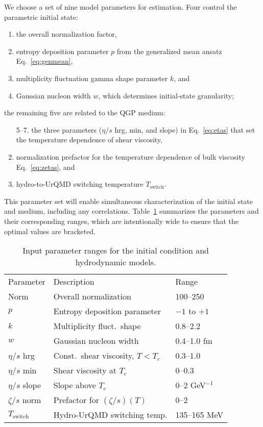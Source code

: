\documentclass[aps,prc,reprint,amsmath,nofootinbib,superscriptaddress]{revtex4-1}
\newcommand{\paddedhline}{\noalign{\smallskip}\hline\noalign{\smallskip}}
\begin{document}
We choose a set of nine model parameters for estimation.
Four control the parametric initial state:
\begin{enumerate}
  \item the overall normalization factor,
  \item entropy deposition parameter $p$ from the generalized mean ansatz Eq.~\eqref{eq:genmean},
  \item multiplicity fluctuation gamma shape parameter $k$, and
  \item Gaussian nucleon width $w$, which determines initial-state granularity;
\end{enumerate}
the remaining five are related to the QGP medium:
\begin{enumerate}
  \item[5--7.] the three parameters ($\eta/s$ hrg, min, and slope) in Eq.~\eqref{eq:etas} that set the temperature dependence of shear viscosity,
  \setcounter{enumi}{7}
  \item normalization prefactor for the temperature dependence of bulk viscosity Eq.~\eqref{eq:zetas}, and
  \item hydro-to-UrQMD switching temperature $T_\text{switch}$.
\end{enumerate}
This parameter set will enable simultaneous characterization of the initial state and medium, including any correlations.
Table~\ref{tab:design} summarizes the parameters and their corresponding ranges, which are intentionally wide to ensure that the optimal values are bracketed.

\begin{table}
  \caption{
    \label{tab:design}
    Input parameter ranges for the initial condition and hydrodynamic models.
  }
  \begin{ruledtabular}
  \begin{tabular}{lll}
    Parameter         & Description                        & Range           \\
    \paddedhline
    Norm              & Overall normalization              & 100--250        \\
    $p$               & Entropy deposition parameter       & $-1$ to $+1$    \\
    $k$               & Multiplicity fluct.\ shape         & 0.8--2.2        \\
    $w$               & Gaussian nucleon width             & 0.4--1.0 fm     \\
    $\eta/s$ hrg      & Const.\ shear viscosity, $T < T_c$ & 0.3--1.0        \\
    $\eta/s$ min      & Shear viscosity at $T_c$           & 0--0.3          \\
    $\eta/s$ slope    & Slope above $T_c$                  & 0--2 GeV$^{-1}$ \\
    $\zeta/s$ norm    & Prefactor for $(\zeta/s)(T)$       & 0--2            \\
    $T_\text{switch}$ & Hydro-UrQMD switching temp.        & 135--165 MeV    \\
  \end{tabular}
  \end{ruledtabular}
\end{table}
\end{document}
